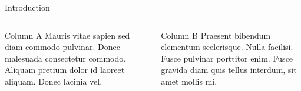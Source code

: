 \documentclass{beamer}
\begin{document}
\begin{frame}{Introduction}

  \begin{columns}

    \begin{column}{0.5\textwidth}
      \begin{block}{Column A}
        Mauris vitae sapien sed diam commodo pulvinar. Donec malesuada consectetur commodo. Aliquam pretium dolor id laoreet aliquam. Donec lacinia vel.
      \end{block}
    \end{column}

    \begin{column}{0.5\textwidth}
      \begin{block}{Column B}
        Praesent bibendum elementum scelerisque. Nulla facilisi. Fusce pulvinar porttitor enim. Fusce gravida diam quis tellus interdum, sit amet mollis mi.
      \end{block}
    \end{column}

  \end{columns}

\end{frame}
\end{document}
